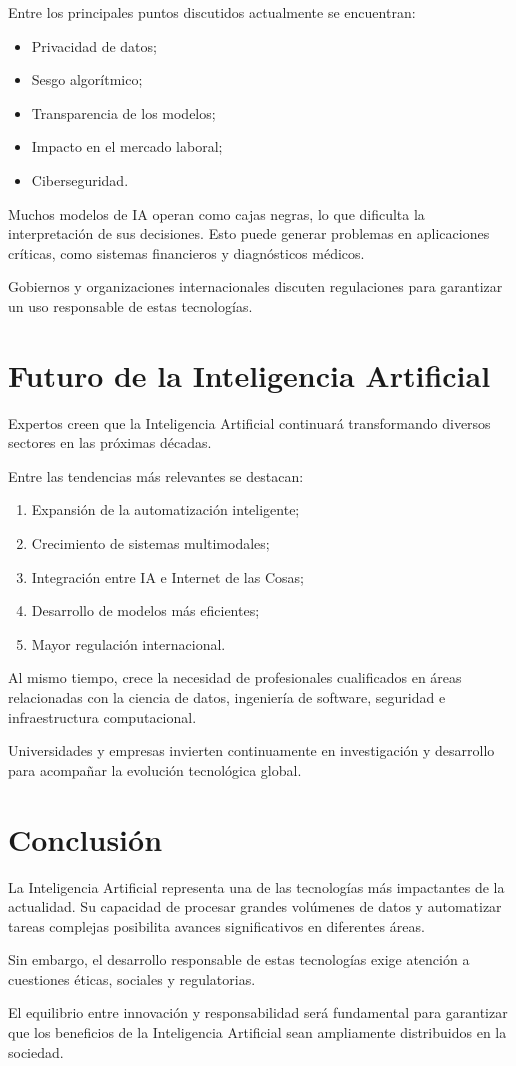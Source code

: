 \documentclass[11pt]{article}
\begin{document}
Entre los principales puntos discutidos actualmente se encuentran:

\begin{itemize}
    \item Privacidad de datos;
    \item Sesgo algorítmico;
    \item Transparencia de los modelos;
    \item Impacto en el mercado laboral;
    \item Ciberseguridad.
\end{itemize}

Muchos modelos de IA operan como cajas negras, lo que dificulta la interpretación de sus decisiones.
Esto puede generar problemas en aplicaciones críticas, como sistemas financieros y diagnósticos
médicos.

Gobiernos y organizaciones internacionales discuten regulaciones para garantizar un uso
responsable de estas tecnologías. 

\section{Futuro de la Inteligencia Artificial}

Expertos creen que la Inteligencia Artificial continuará transformando diversos sectores
en las próximas décadas.

Entre las tendencias más relevantes se destacan:

\begin{enumerate}
    \item Expansión de la automatización inteligente;
    \item Crecimiento de sistemas multimodales;
    \item Integración entre IA e Internet de las Cosas;
    \item Desarrollo de modelos más eficientes;
    \item Mayor regulación internacional.
\end{enumerate}

Al mismo tiempo, crece la necesidad de profesionales cualificados en áreas relacionadas con la
ciencia de datos, ingeniería de software, seguridad e infraestructura computacional.

Universidades y empresas invierten continuamente en investigación y desarrollo para
acompañar la evolución tecnológica global. 

\section{Conclusión}

La Inteligencia Artificial representa una de las tecnologías más impactantes de la actualidad. Su
capacidad de procesar grandes volúmenes de datos y automatizar tareas complejas posibilita
avances significativos en diferentes áreas.

Sin embargo, el desarrollo responsable de estas tecnologías exige atención a cuestiones éticas,
sociales y regulatorias.

El equilibrio entre innovación y responsabilidad será fundamental para garantizar que los beneficios
de la Inteligencia Artificial sean ampliamente distribuidos en la sociedad. 
\end{document}
